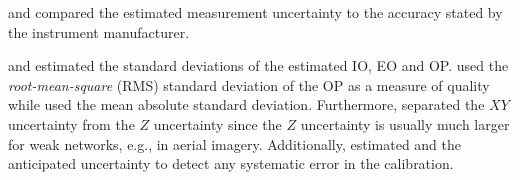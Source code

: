     \citet{Rabbani2007:Integrated} and \citet{Fraser1995:Multi_sensor_self_calib} 
    compared the estimated measurement uncertainty to the accuracy stated by
    the instrument manufacturer.

    \citet{Fraser1995:Multi_sensor_self_calib} and \citet{Labe2008:Quality}
    estimated the standard deviations of the estimated IO, EO and OP.
    \citet{Fraser1995:Multi_sensor_self_calib} used the 
    \textit{root-mean-square} (RMS) standard deviation of the OP as a 
    measure of quality while \citet{Rabbani2007:Integrated} used the 
    mean absolute standard deviation.
    Furthermore, \citet{Fraser1995:Multi_sensor_self_calib} separated 
    the $XY$ uncertainty from the $Z$ uncertainty since the $Z$ uncertainty
    is usually much larger for weak networks, e.g., in aerial imagery.
    Additionally, \citet{Fraser1995:Multi_sensor_self_calib} 
    estimated and the anticipated uncertainty to detect any 
    systematic error in the calibration.
